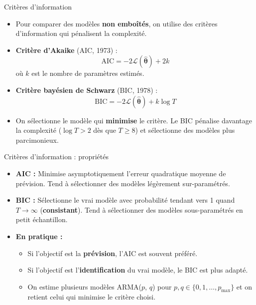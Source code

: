 \documentclass[11pt,aspectratio=169]{beamer}
\begin{document}
\begin{frame}{Critères d'information}

\begin{itemize}

\item Pour comparer des modèles \textbf{non emboîtés}, on utilise des critères d'information qui pénalisent la complexité.\newline

\item \textbf{Critère d'Akaike} (AIC, 1973) :
  \[
  \text{AIC} = -2\mathcal{L}(\hat{\bm{\theta}}) + 2k
  \]
  où $k$ est le nombre de paramètres estimés.\newline

\item \textbf{Critère bayésien de Schwarz} (BIC, 1978) :
  \[
  \text{BIC} = -2\mathcal{L}(\hat{\bm{\theta}}) + k\log T
  \]\newline

\item On sélectionne le modèle qui \textbf{minimise} le critère. Le BIC pénalise davantage la complexité ($\log T > 2$ dès que $T \geq 8$) et sélectionne des modèles plus parcimonieux.

\end{itemize}

\end{frame}

\begin{frame}{Critères d'information : propriétés}

\begin{itemize}

\item \textbf{AIC :} Minimise asymptotiquement l'erreur quadratique moyenne de prévision. Tend à sélectionner des modèles légèrement sur-paramétrés.\newline

\item \textbf{BIC :} Sélectionne le vrai modèle avec probabilité tendant vers 1 quand $T \to \infty$ (\textbf{consistant}). Tend à sélectionner des modèles sous-paramétrés en petit échantillon.\newline

\item \textbf{En pratique :}
  \begin{itemize}
  \item Si l'objectif est la \textbf{prévision}, l'AIC est souvent préféré.
  \item Si l'objectif est l'\textbf{identification} du vrai modèle, le BIC est plus adapté.
  \item On estime plusieurs modèles ARMA($p$, $q$) pour $p, q \in \{0, 1, \ldots, p_{\max}\}$ et on retient celui qui minimise le critère choisi.
  \end{itemize}

\end{itemize}

\end{frame}
\end{document}
